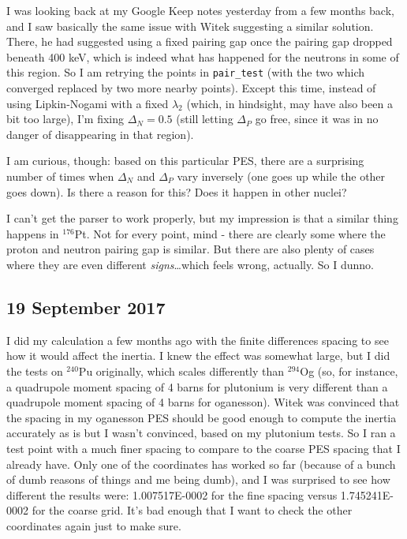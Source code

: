 \documentclass[]{report}
\begin{document}
I was looking back at my Google Keep notes yesterday from a few months back, and I saw basically the same issue with Witek suggesting a similar solution. There, he had suggested using a fixed pairing gap once the pairing gap dropped beneath 400 keV, which is indeed what has happened for the neutrons in some of this region. So I am retrying the points in \texttt{pair\_test} (with the two which converged replaced by two more nearby points). Except this time, instead of using Lipkin-Nogami with a fixed $\lambda_2$ (which, in hindsight, may have also been a bit too large), I'm fixing $\Delta_N=0.5$ (still letting $\Delta_P$ go free, since it was in no danger of disappearing in that region).

I am curious, though: based on this particular PES, there are a surprising number of times when $\Delta_N$ and $\Delta_P$ vary inversely (one goes up while the other goes down). Is there a reason for this? Does it happen in other nuclei?

\begin{adjustwidth}{1cm}{}
\rightarrow\quad I can't get the parser to work properly, but my impression is that a similar thing happens in $^{176}$Pt. Not for every point, mind - there are clearly some where the proton and neutron pairing gap is similar. But there are also plenty of cases where they are even different \textit{signs}\dots which feels wrong, actually. So I dunno.
\end{adjustwidth}

\subsection*{19 September 2017}
I did my calculation a few months ago with the finite differences spacing to see how it would affect the inertia. I knew the effect was somewhat large, but I did the tests on $^{240}$Pu originally, which scales differently than $^{294}$Og (so, for instance, a quadrupole moment spacing of 4 barns for plutonium is very different than a quadrupole moment spacing of 4 barns for oganesson). Witek was convinced that the spacing in my oganesson PES should be good enough to compute the inertia accurately as is but I wasn't convinced, based on my plutonium tests. So I ran a test point with a much finer spacing to compare to the coarse PES spacing that I already have. Only one of the coordinates has worked so far (because of a bunch of dumb reasons of things and me being dumb), and I was surprised to see how different the results were: 1.007517E-0002 for the fine spacing versus 1.745241E-0002 for the coarse grid. It's bad enough that I want to check the other coordinates again just to make sure.
\end{document}
